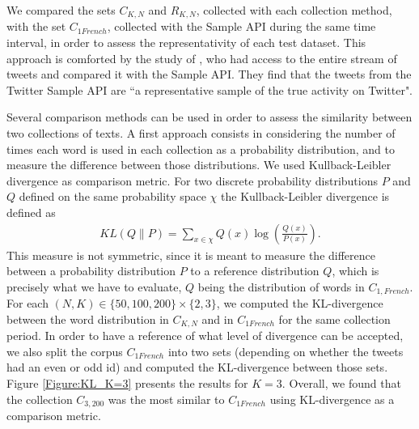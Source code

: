 We compared the sets $C_{K,N}$ and $R_{K,N}$, collected with each collection method, with the set $C_{1 French}$, collected with the Sample API during the same time interval, in order to assess the representativity of each test dataset. This approach is comforted by the study of \citet{morstatter_when_2014}, who had access to the entire stream of tweets and compared it with the Sample API. They find that the tweets from the Twitter Sample API are ``a representative sample of the true activity on Twitter".  


Several comparison methods can be used in order to assess the similarity between two collections of texts. A first approach consists in considering the number of times each word is used in each collection as a probability distribution, and to measure the difference between those distributions. We used Kullback-Leibler divergence \citep{kullback_information_1997} as comparison metric. For two discrete probability distributions $P$ and $Q$ defined on the same probability space $\chi$ the Kullback-Leibler divergence is defined as
\begin{align}
\label{eq:KL}
KL(Q\|P) =  \sum_{x\in \chi}Q(x)\log{(\frac{Q(x)}{P(x)})}.
\end{align}
This measure is not symmetric, since it is meant to measure the difference between a probability distribution $P$ to a reference distribution $Q$, which is precisely what we have to evaluate, $Q$ being the distribution of words in $C_{1, French}$. For each $(N,K) \in  \{50, 100, 200\} \times \{2,3\}$, we computed the KL-divergence between the word distribution in $C_{K,N}$ and in $C_{1 French}$ for the same collection period. In order to have a reference of what level of divergence can be accepted, we also split the corpus $C_{1 French}$ into two sets (depending on whether the tweets had an even or odd id) and computed the KL-divergence between those sets. Figure \ref{Figure:KL_K=3} presents the results for $K=3$. Overall, we found that the collection $C_{3,200}$ was the most similar to $C_{1 French}$ using KL-divergence as a comparison metric.


